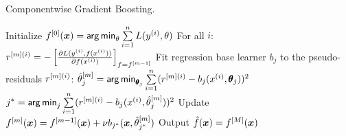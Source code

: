 
\begin{algorithm}[H]
  \begin{footnotesize}
  \begin{center}
  \caption{Componentwise Gradient Boosting.}
    \begin{algorithmic}[1]
      \State Initialize $f^{[0]}(\bm{x}) = \mathop{\sf arg\,min}_{\theta} \sum  \limits_{i=1}^n L(y^{(i)}, \theta)$
        \State For all $i$: $r^{[m](i)} = -\left[\frac{\partial{L(y^{(i)}, f(x^{(i)}))}}{\partial f(x^{(i)})}\right]_{f=f^{[m-1]}}$
          \State Fit regression base learner $b_j$ to the pseudo-residuals $r^{[m](i)}$:
          \State $\hat{\theta}^{[m]}_j = \mathop{\sf arg\,min}_{\pmb\theta_j} \sum  \limits_{i=1}^n 
          (r^{[m](i)} - b_j(x^{(i)}, \pmb\theta_j))^2$
        \EndFor
        \State $j^* = \mathop{\sf arg\,min}_{j} \sum  \limits_{i=1}^n (r^{[m](i)} - b_j(x^{(i)}, \hat{\theta}^{[m]}_j))^2$
        \State Update $f^{[m]}(\bm{x}) = f^{[m-1]}(\bm{x}) + \nu b_{j^*}(\bm{x}, \hat{\theta}^{[m]}_{j^{\ast}})$
      \EndFor
      \State Output $\hat{f}(\bm{x}) = f^{[M]}(\bm{x})$
    \end{algorithmic}
    \end{center}
    \end{footnotesize}
\end{algorithm}
